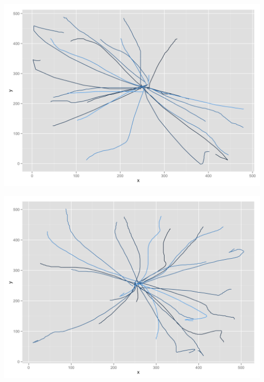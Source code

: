 \begin{appendices}
\begin{minipage}{\textwidth}
\begin{minipage}{0.5\linewidth}
	\end{minipage}
	\begin{minipage}{0.5\linewidth}
		\includegraphics[width=\linewidth]{images/plots/plot_analysis_qualitative_225}
	\end{minipage}
	\begin{minipage}{0.5\linewidth}
		\includegraphics[width=\linewidth]{images/plots/plot_analysis_qualitative_161}
	\end{minipage}
	\begin{minipage}{0.5\linewidth}

\end{minipage}
\end{minipage}
\end{appendices}
